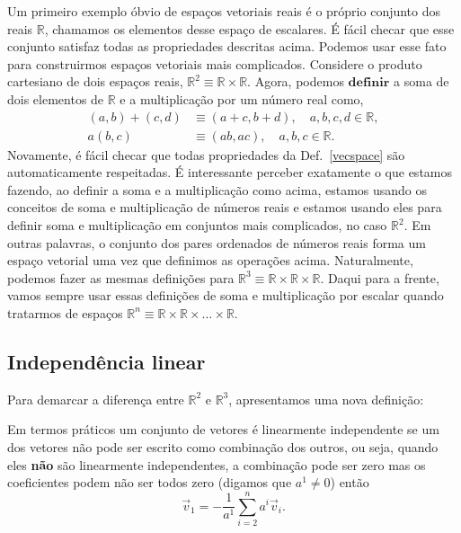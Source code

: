 Um primeiro exemplo óbvio de espaços vetoriais reais é o próprio conjunto dos
reais $\mathbb{R}$, chamamos os elementos desse espaço de escalares. É fácil
checar que esse conjunto satisfaz todas as propriedades descritas acima. Podemos
usar esse fato para construirmos espaços vetoriais mais complicados. Considere o
produto cartesiano de dois espaços reais, $\mathbb{R}^2 \equiv
	\mathbb{R}\times\mathbb{R}$. Agora, podemos $\mathbf{definir}$ a soma de dois
elementos de $\mathbb{R}$ e a multiplicação por um número real como,
\begin{align}
	(a,b) + (c,d) & \equiv (a + c, b+d), \quad a,b,c,d \in \mathbb{R}, \\
	a(b,c)        & \equiv (ab, ac), \quad a,b,c\in\mathbb{R}.
\end{align}
Novamente, é fácil checar que todas propriedades da Def.~\ref{vecspace} são
automaticamente respeitadas. É interessante perceber exatamente o que estamos
fazendo, ao definir a soma e a multiplicação como acima, estamos usando os
conceitos de soma e multiplicação de números reais e estamos usando eles para
definir soma e multiplicação em conjuntos mais complicados, no caso
$\mathbb{R}^2$. Em outras palavras, o conjunto dos pares ordenados de números
reais forma um espaço vetorial uma vez que definimos as operações acima.
Naturalmente, podemos fazer as mesmas definições para $\mathbb{R}^3 \equiv
	\mathbb{R}\times\mathbb{R}\times\mathbb{R}$. Daqui para a frente, vamos sempre
usar essas definições de soma e multiplicação por escalar quando tratarmos de
espaços $\mathbb{R}^n \equiv
	\mathbb{R}\times\mathbb{R}\times\dots\times\mathbb{R}$.

\subsection{Independência linear}

Para demarcar a diferença entre $\mathbb{R}^2$ e $\mathbb{R}^3$, apresentamos
uma nova definição:

Em termos práticos um conjunto de vetores é linearmente independente se um dos
vetores não pode ser escrito como combinação dos outros, ou seja, quando eles
\textbf{não} são linearmente independentes, a combinação pode ser zero mas os
coeficientes podem não ser todos zero (digamos que $a^1 \neq 0$) então
\begin{equation}
	\vec{v}_1 = -\frac{1}{a^1}\sum_{i=2}^n a^i\vec{v}_i.
\end{equation}

